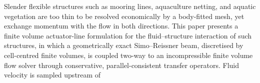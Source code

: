 \documentclass[sn-mathphys,Numbered]{sn-jnl}%
\begin{document}
{%
Slender flexible structures such as mooring lines, aquaculture netting, and
aquatic vegetation are too thin to be resolved economically by a body-fitted
mesh, yet exchange momentum with the flow in both directions. This paper
presents a finite volume actuator-line formulation for the fluid--structure
interaction of such structures, in which a geometrically exact Simo--Reissner
beam, discretised by cell-centred finite volumes, is coupled two-way to an
incompressible finite volume flow solver through conservative,
parallel-consistent transfer operators. Fluid velocity is sampled upstream of
}
\end{document}
